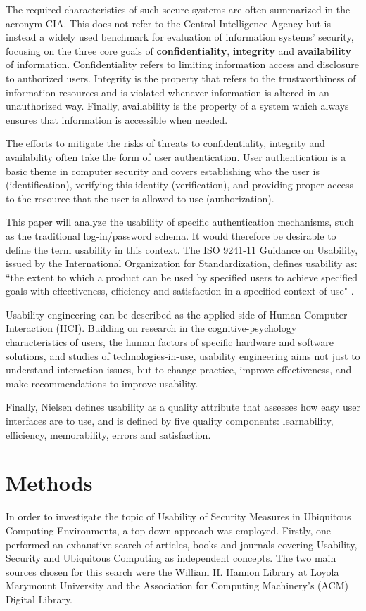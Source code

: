 \documentclass{article}
\begin{document}
The required characteristics of such secure systems are often summarized in the acronym CIA. This does not refer to the Central Intelligence Agency but is instead a widely used benchmark for evaluation of information systems' security, focusing on the three core goals of \textbf{confidentiality}, \textbf{integrity} and \textbf{availability} of information. Confidentiality refers to limiting information access and disclosure to authorized users. Integrity is the property that refers to the trustworthiness of information resources and is violated whenever information is altered in an unauthorized way. Finally, availability is the property of a system which always ensures that information is accessible when needed. 

The efforts to mitigate the risks of threats to confidentiality, integrity and availability often take the form of user authentication. User authentication is a basic theme in computer security and covers establishing who the user is (identification), verifying this identity (verification), and providing proper access to the resource that the user is allowed to use (authorization). 

This paper will analyze the usability of specific authentication mechanisms, such as the traditional log-in/password schema. It would therefore be desirable to define the term usability in this context. The ISO 9241-11 Guidance on Usability, issued by the International Organization for Standardization, defines usability as: ``the extent to which a product can be used by specified users to achieve specified goals with effectiveness, efficiency and satisfaction in a specified context of use" \cite{iso1998international}.

Usability engineering can be described as the applied side of Human-Computer Interaction (HCI). Building on research in the cognitive-psychology characteristics of users, the human factors of specific hardware and software solutions, and studies of technologies-in-use, usability engineering aims not just to understand interaction issues, but to change practice, improve effectiveness, and make recommendations to improve usability.  

Finally, Nielsen\cite{nielsenusability2012} defines usability as a quality attribute that assesses how easy user interfaces are to use, and is defined by five quality components: learnability, efficiency, memorability, errors and satisfaction. 

\section{Methods}
In order to investigate the topic of Usability of Security Measures in Ubiquitous Computing Environments, a top-down approach was employed. Firstly, one performed an exhaustive search of articles, books and journals covering Usability, Security and Ubiquitous Computing as independent concepts. The two main sources chosen for this search were the William H. Hannon Library at Loyola Marymount University and the Association for Computing Machinery's (ACM) Digital Library.  
\end{document}
